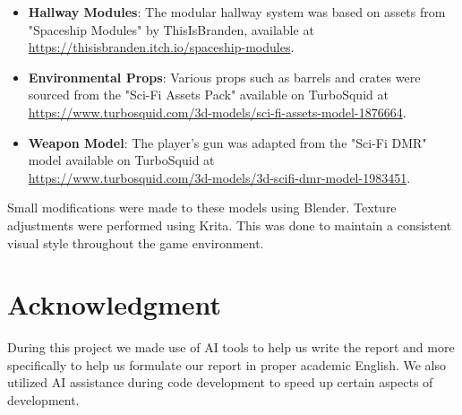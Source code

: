 \documentclass{article}
\begin{document}
\begin{itemize}
    \item \textbf{Hallway Modules}: The modular hallway system was based on
	    assets from "Spaceship Modules" by ThisIsBranden, available at
		\url{https://thisisbranden.itch.io/spaceship-modules}.

    \item \textbf{Environmental Props}: Various props such as barrels and
	    crates were sourced from the "Sci-Fi Assets Pack" available on
		TurboSquid at
		\url{https://www.turbosquid.com/3d-models/sci-fi-assets-model-1876664}.

    \item \textbf{Weapon Model}: The player's gun was adapted from the "Sci-Fi
	    DMR" model available on TurboSquid
		at\\\url{https://www.turbosquid.com/3d-models/3d-scifi-dmr-model-1983451}.
\end{itemize}

Small modifications were made to these models using Blender. Texture adjustments were performed using Krita. This was done to maintain a consistent visual style throughout the game environment.

\section{Acknowledgment}
During this project we made use of AI tools to help us write the report and more
specifically to help us formulate our report in proper academic English. We also
utilized AI assistance during code development to speed up certain aspects of development.

% 
% 
\end{document}
